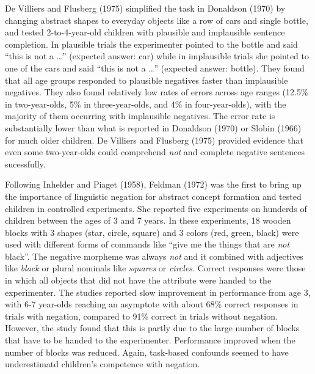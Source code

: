 \documentclass[man,floatsintext]{apa6}
\begin{document}
De Villiers and Flusberg (1975) simplified the task in Donaldson (1970) by changing abstract shapes to everyday objects like a row of cars and single bottle, and tested 2-to-4-year-old children with plausible and implausible sentence completion. In plausible trials the experimenter pointed to the bottle and said \enquote{this is not a \ldots{}} (expected answer: car) while in implausible trials she pointed to one of the cars and said \enquote{this is not a \ldots{}} (expected answer: bottle). They found that all age groups responded to plausible negatives faster than implausible negatives. They also found relatively low rates of errors across age ranges (12.5\% in two-year-olds, 5\% in three-year-olds, and 4\% in four-year-olds), with the majority of them occurring with implausible negatives. The error rate is substantially lower than what is reported in Donaldson (1970) or Slobin (1966) for much older children. De Villiers and Flusberg (1975) provided evidence that even some two-year-olds could comprehend \emph{not} and complete negative sentences sucessfully.

Following Inhelder and Piaget (1958), Feldman (1972) was the first to bring up the importance of linguistic negation for abstract concept formation and tested children in controlled experiments. She reported five experiments on hunderds of children between the ages of 3 and 7 years. In these experiments, 18 wooden blocks with 3 shapes (star, circle, square) and 3 colors (red, green, black) were used with different forms of commands like \enquote{give me the things that are \emph{not} black}. The negative morpheme was always \emph{not} and it combined with adjectives like \emph{black} or plural nominals like \emph{squares} or \emph{circles}. Correct responses were those in which all objects that did not have the attribute were handed to the experimenter. The studies reported slow improvement in performance from age 3, with 6-7 year-olds reaching an asymptote with about 68\% correct responses in trials with negation, compared to 91\% correct in trials without negation. However, the study found that this is partly due to the large number of blocks that have to be handed to the experimenter. Performance improved when the number of blocks was reduced. Again, task-based confounds seemed to have underestimatd children's competence with negation.
\end{document}
